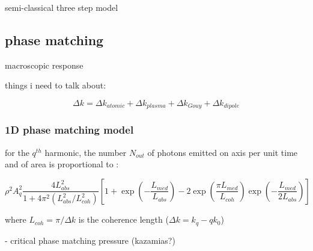semi-classical three step model


\subsection{phase matching}

macroscopic response

things i need to talk about: 

\begin{equation}
\Delta k = \Delta k_{atomic} + \Delta k_{plasma} + \Delta k_{Gouy} + \Delta k_{dipole}
\end{equation}

\subsubsection{1D phase matching model}

for the $q^{th}$ harmonic, the number $N_{out}$ of photons emitted on axis per unit time and of area is proportional to \cite{constantOptimizingHighHarmonic1999}:

\begin{equation}
\rho^2 A_q^2 \frac{4L_{abs}^2}{1+4\pi^2(L_{abs}^2 / L_{coh}^2)} \left[ 1 + \exp\left(-\frac{L_{med}}{L_{abs}}\right) - 2 \exp\left(\frac{\pi L_{med}}{L_{coh}}\right) \exp\left(-\frac{L_{med}}{2L_{abs}}\right) \right]
\label{eqn:HHGNout}
\end{equation}

where $L_{coh} = \pi/\Delta k$ is the coherence length ($\Delta k = k_q - q k_0$)


- critical phase matching pressure (kazamias?)
